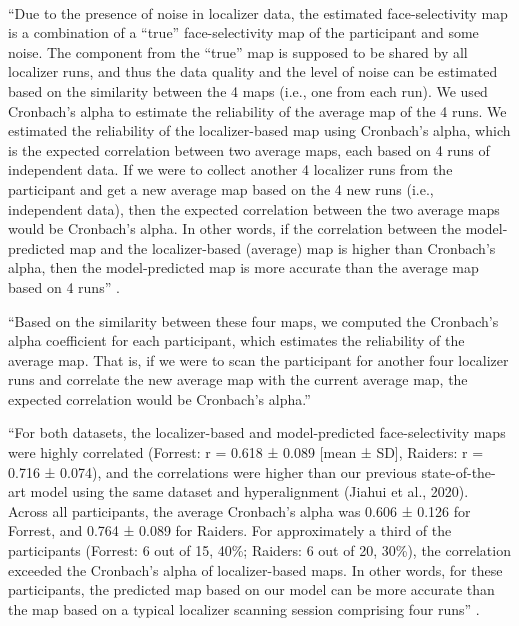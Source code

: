 \paragraph{\citet{feilong2022individualized}}
%
``Due to the presence of noise in localizer data, the estimated face-selectivity
map is a combination of a “true” face-selectivity map of the participant and
some noise.
%
The component from the “true” map is supposed to be shared by all localizer
runs, and thus the data quality and the level of noise can be estimated based on
the similarity between the 4 maps (i.e., one from each run).
%
We used Cronbach's alpha to estimate the reliability  of the average map of the
4 runs.
%
We estimated the reliability of the localizer-based map using Cronbach's alpha,
which is the expected correlation between two average maps, each based on 4 runs
of independent data.
%
If we were to collect another 4 localizer runs from the participant and get a
new average map based on the 4 new runs (i.e., independent data), then the
expected correlation between the two average maps would be Cronbach's alpha.
%
In other words, if the correlation between the model-predicted map and the
localizer-based (average) map is higher than Cronbach's alpha, then the
model-predicted map is more accurate than the average map based on 4 runs''
\citep{feilong2022individualized}.

%
``Based on the similarity between these four maps, we computed the Cronbach's
alpha coefficient for each participant, which estimates the reliability of the
average map.
%
That is, if we were to scan the participant for another four localizer runs and
correlate the new average map with the current average map, the expected
correlation would be Cronbach's alpha.'' \citep{feilong2022individualized}

%
``For both datasets, the localizer-based and model-predicted face-selectivity
maps were highly correlated (Forrest: r = 0.618 ± 0.089 [mean ± SD], Raiders: r
= 0.716 ± 0.074), and the correlations were higher than our previous
state-of-the-art model using the same dataset and hyperalignment (Jiahui et al.,
2020).
%
Across all participants, the average Cronbach's alpha was 0.606 ± 0.126 for
Forrest, and 0.764 ± 0.089 for Raiders.
%
For approximately a third of the participants (Forrest: 6 out of 15, 40\%;
Raiders: 6 out of 20, 30\%), the correlation exceeded the Cronbach's alpha of
localizer-based maps.
%
In other words, for these participants, the predicted map based on our model can
be more accurate than the map based on a typical localizer scanning session
comprising four runs'' \citep{feilong2022individualized}.

